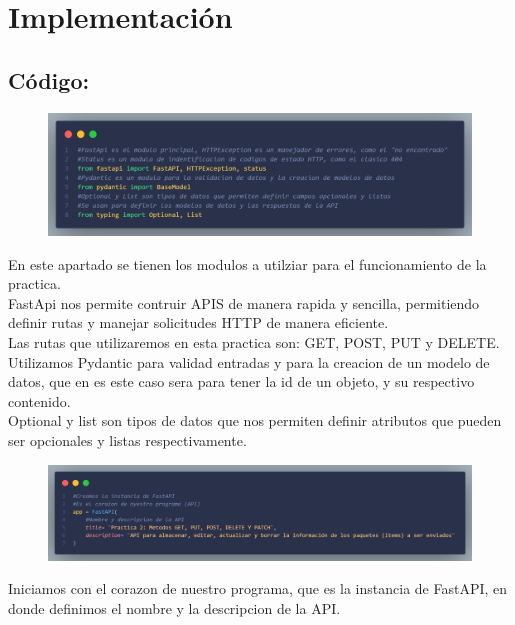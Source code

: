 \documentclass[12pt]{article}
\begin{document}
\section{Implementación}
\subsection*{Código:}
\begin{figure}[h!]
    \centering
    \includegraphics[width=1\textwidth]{Imagenes/Captura1_librerias.png}
\end{figure}

En este apartado se tienen los modulos a utilziar para el funcionamiento de la practica.\\
FastApi nos permite contruir APIS de manera rapida y sencilla, permitiendo definir rutas y manejar solicitudes HTTP de manera eficiente.\\
Las rutas que utilizaremos en esta practica son: GET, POST, PUT y DELETE.\\
Utilizamos Pydantic para validad entradas y para la creacion de un modelo de datos, que en es este caso sera para tener la id de un objeto, y su respectivo contenido.\\
Optional y list son tipos de datos que nos permiten definir atributos que pueden ser opcionales y listas respectivamente.\\


\begin{figure}[h!]
    \centering
    \includegraphics[width=1\textwidth]{Imagenes/Captura2_corazon del programa.png}
\end{figure}

Iniciamos con el corazon de nuestro programa, que es la instancia de FastAPI, en donde definimos el nombre y la descripcion de la API.\\
\end{document}
